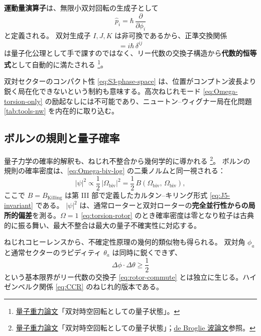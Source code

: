 \documentclass[dvipdfmx,a4paper,oneside]{jsbook}
\numberwithin{equation}{chapter}
\begin{document}
\textbf{運動量演算子}は、無限小双対回転の生成子として
\begin{equation}
  \hat{p}_i = \hbar\,\frac{\partial}{\partial \phi_i}
  \label{eq:momentum-operator}
\end{equation}
と定義される。
双対生成子 \(I, J, K\) は非可換であるから、正準交換関係
\begin{equation}
  [\hat{x}^i,\, \hat{p}_j] = i\hbar\,\delta^{ij}
  \label{eq:CCR}
\end{equation}
は量子化公理として手で課すのではなく、リー代数の交換子構造から\textbf{代数的恒等式}として自動的に満たされる \footnote{\hyperref[sec:sister-manuscripts]{量子重力論文}「双対時空回転としての量子状態」。}。

双対セクターのコンパクト性 \eqref{eq:S3-phase-space} は、位置がコンプトン波長より鋭く局在化できないという制約も意味する。高次ねじれモード \eqref{eq:Omega-torsion-only} の励起なしには不可能であり、ニュートン--ウィグナー局在化問題 \eqref{tab:tools-nw} を内在的に取り込む。

\subsection{ボルンの規則と量子確率}

量子力学の確率的解釈も、ねじれ不整合から幾何学的に導かれる \footnote{\hyperref[sec:sister-manuscripts]{量子重力論文}「双対時空回転としての量子状態」；\hyperref[sec:sister-manuscripts]{de Broglie 波論文}参照。}。
ボルンの規則の確率密度は、\eqref{eq:Omega-biv-log} の二乗ノルムと同一視される：
\begin{equation}
  |\psi|^2
  \propto \frac{1}{2}\,|\Omega_{\mathrm{biv}}|^2
  = \frac{1}{2}\,B(\Omega_{\mathrm{biv}},\,\Omega_{\mathrm{biv}}),
  \label{eq:born-torsion}
\end{equation}
ここで \(B = B_{\mathrm{Killing}}\) は第 III 部で定義したカルタン--キリング形式 \eqref{eq:J5-invariant} である。
\(|\psi|^2\) は、通常ローターと双対ローターの\textbf{完全並行性からの局所的偏差}を測る。\(\Omega = 1\) \eqref{eq:torsion-rotor} のとき確率密度は零となり粒子は古典的に振る舞い、最大不整合は最大の量子不確実性に対応する。

ねじれコヒーレンスから、不確定性原理の幾何的類似物も得られる。
双対角 \(\phi_a\) と通常セクターのラピディティ \(\theta_a\) は同時に鋭くできず、
\begin{equation}
  \Delta\phi \cdot \Delta\theta \geq \frac{1}{2}
  \label{eq:uncertainty-torsion}
\end{equation}
という基本限界がリー代数の交換子 \eqref{eq:rotor-commute} とは独立に生じる。ハイゼンベルク関係 \eqref{eq:CCR} のねじれ的版本である。
\end{document}
